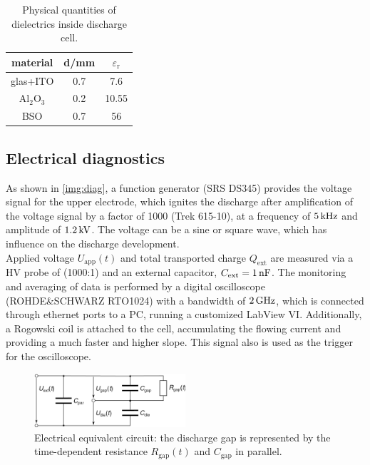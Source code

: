\documentclass[a4paper,10pt,twoside]{article}
\newcommand{\ix}[1]{_\text{#1}}
\begin{document}
				\begin{table}[h]
					\centering
					\begin{tabular}{c|c|c}
						material & d/mm & $\varepsilon\ix{r}$ \\
						\hline \hline glas+ITO & 0.7 & 7.6 \\
						\hline Al$\ix{2}$O$\ix{3}$ & 0.2 & 10.55 \\
						\hline BSO & 0.7 & 56 \\
					\end{tabular}
					\caption{Physical quantities of dielectrics inside discharge cell.}
					\label{tab:permits}
				\end{table}

		\subsection{Electrical diagnostics}\label{subsec:electric}
				
			 As shown in \autoref{img:diag}, a function generator (SRS DS345) provides the voltage signal for the upper electrode, which ignites the discharge after amplification of the voltage signal by a factor of 1000 (Trek 615-10), at a frequency of $\unit[5]{kHz}$ and amplitude of $\unit[1.2]{kV}$. The voltage can be a sine or square wave, which has influence on the discharge development.\\
			 Applied voltage $U\ix{app}(t)$ and total transported charge $Q\ix{ext}$ are measured via a HV probe of (1000:1) and an external capacitor, $C\ix{ext}=\unit[1]{nF}$. The monitoring and averaging of data is performed by a digital oscilloscope (ROHDE\&SCHWARZ RTO1024) with a bandwidth of $\unit[2]{GHz}$, which is connected through ethernet ports to a PC, running a customized LabView VI. Additionally, a Rogowski coil is attached to the cell, accumulating the flowing current and providing a much faster and higher slope. This signal also is used as the trigger for the oscilloscope.
			 
 				\begin{figure}[t!]
 					\centering
 					\hspace{-0.2cm}\includegraphics[width=0.5\textwidth]{figures/setup/replacementcircuit.pdf}
 					\caption{Electrical equivalent circuit: the discharge gap is represented by the time-dependent resistance $R\ix{gap}(t)$ and $C\ix{gap}$ in parallel.}
 					\label{img:circuit}
 				\end{figure}
			 
\end{document}
